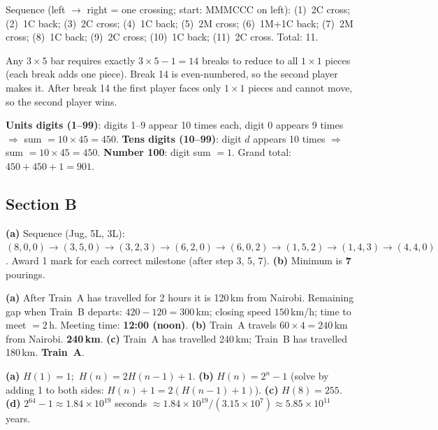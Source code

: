 \begin{solution}[5. (C) 11 crossings]
Sequence (left $\to$ right = one crossing; start: MMMCCC on left):
(1)~2C cross; (2)~1C back; (3)~2C cross; (4)~1C back; (5)~2M cross;
(6)~1M+1C back; (7)~2M cross; (8)~1C back; (9)~2C cross; (10)~1C back;
(11)~2C cross. Total: 11.
\end{solution}

\begin{solution}
Any $3 \times 5$ bar requires exactly $3 \times 5 - 1 = 14$ breaks to reduce to all $1\times 1$ pieces (each break adds one piece). Break 14 is even-numbered, so the second player makes it. After break 14 the first player faces only $1\times 1$ pieces and cannot move, so the second player wins.
\end{solution}

\begin{solution}[7. (C) 901]
\textbf{Units digits (1--99)}: digits 1--9 appear 10 times each, digit 0 appears 9 times $\Rightarrow$ sum $= 10 \times 45 = 450$.
\textbf{Tens digits (10--99)}: digit $d$ appears 10 times $\Rightarrow$ sum $= 10 \times 45 = 450$.
\textbf{Number 100}: digit sum $= 1$.
Grand total: $450 + 450 + 1 = 901$.
\end{solution}

\subsection*{Section B}

\begin{solution}
\textbf{(a)} Sequence (Jug, 5L, 3L):
$(8,0,0) \to (3,5,0) \to (3,2,3) \to (6,2,0) \to (6,0,2)
 \to (1,5,2) \to (1,4,3) \to (4,4,0)$.
Award 1 mark for each correct milestone (after step 3, 5, 7).
\textbf{(b)} Minimum is \textbf{7} pourings.
\end{solution}

\begin{solution}
\textbf{(a)} After Train~A has travelled for 2 hours it is 120\,km from Nairobi. Remaining gap when Train~B departs: $420-120=300$\,km; closing speed $150$\,km/h; time to meet $= 2$\,h. Meeting time: \textbf{12:00 (noon)}.
\textbf{(b)} Train~A travels $60 \times 4 = 240$\,km from Nairobi. \textbf{240\,km}.
\textbf{(c)} Train~A has travelled 240\,km; Train~B has travelled 180\,km. \textbf{Train~A}.
\end{solution}

\begin{solution}
\textbf{(a)} $H(1)=1$;\ $H(n) = 2H(n-1)+1$.
\textbf{(b)} $H(n) = 2^n - 1$ (solve by adding 1 to both sides: $H(n)+1 = 2(H(n-1)+1)$).
\textbf{(c)} $H(8) = 255$.
\textbf{(d)} $2^{64}-1 \approx 1.84 \times 10^{19}$ seconds $\approx 1.84\times10^{19}/(3.15\times10^7)
\approx 5.85 \times 10^{11}$ years.
\end{solution}

